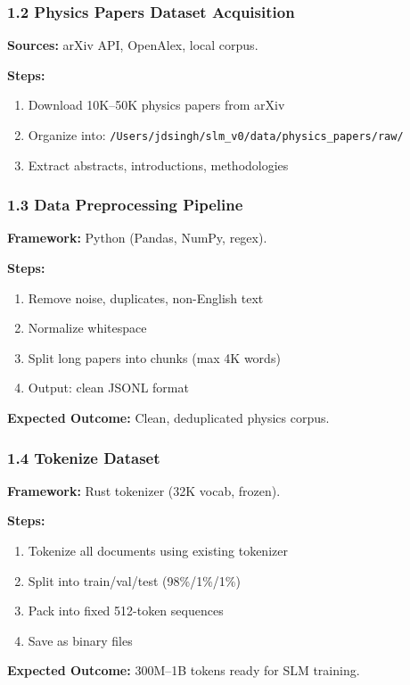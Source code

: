 \documentclass[11pt]{article}
\begin{document}
\subsubsection{1.2 Physics Papers Dataset Acquisition}
\textbf{Sources:} arXiv API, OpenAlex, local corpus.

\textbf{Steps:}
\begin{enumerate}[leftmargin=1.5em]
  \item Download 10K--50K physics papers from arXiv
  \item Organize into: \texttt{/Users/jdsingh/slm\_v0/data/physics\_papers/raw/}
  \item Extract abstracts, introductions, methodologies
\end{enumerate}

\subsubsection{1.3 Data Preprocessing Pipeline}
\textbf{Framework:} Python (Pandas, NumPy, regex).

\textbf{Steps:}
\begin{enumerate}[leftmargin=1.5em]
  \item Remove noise, duplicates, non-English text
  \item Normalize whitespace
  \item Split long papers into chunks (max 4K words)
  \item Output: clean JSONL format
\end{enumerate}

\textbf{Expected Outcome:} Clean, deduplicated physics corpus.

\subsubsection{1.4 Tokenize Dataset}
\textbf{Framework:} Rust tokenizer (32K vocab, frozen).

\textbf{Steps:}
\begin{enumerate}[leftmargin=1.5em]
  \item Tokenize all documents using existing tokenizer
  \item Split into train/val/test (98\%/1\%/1\%)
  \item Pack into fixed 512-token sequences
  \item Save as binary files
\end{enumerate}

\textbf{Expected Outcome:} 300M--1B tokens ready for SLM training.
\end{document}
